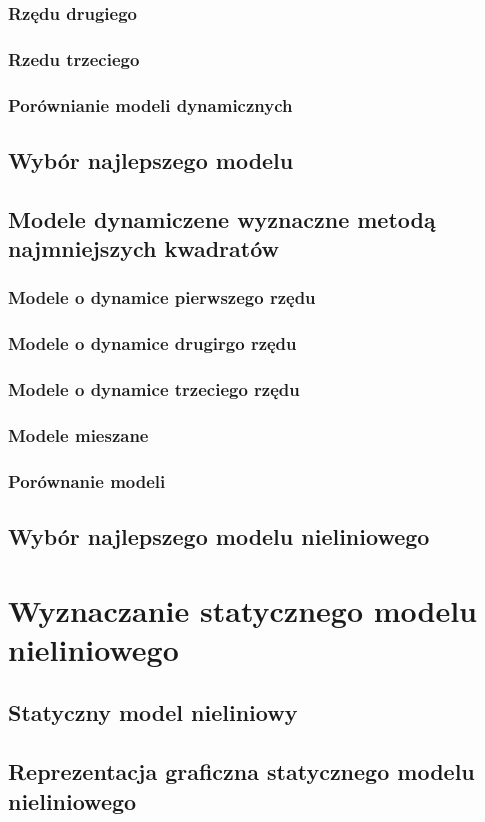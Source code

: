 \documentclass[a4paper, 11pt]{article}
\begin{document}
\subsubsection{Rzędu drugiego}
\subsubsection{Rzedu trzeciego}
\subsubsection{Porównianie modeli dynamicznych}
\subsection{Wybór najlepszego modelu}
\subsection{Modele dynamiczene wyznaczne metodą najmniejszych kwadratów} 
\subsubsection{Modele o dynamice pierwszego rzędu}
\subsubsection{Modele o dynamice drugirgo rzędu}
\subsubsection{Modele o dynamice trzeciego rzędu}
\subsubsection{Modele mieszane}
\subsubsection{Porównanie modeli} %
\subsection{Wybór najlepszego modelu nieliniowego}


\section{Wyznaczanie statycznego modelu nieliniowego}
\subsection{Statyczny model nieliniowy}
\subsection{Reprezentacja graficzna statycznego modelu nieliniowego}
\end{document}
